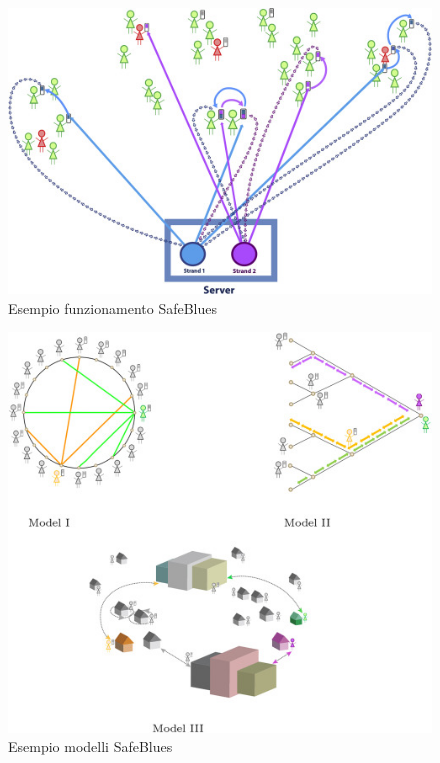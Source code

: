 \begin{figure}[h]
    \includegraphics[width=\linewidth]{img/gr2.jpg}
    \caption{Esempio funzionamento SafeBlues}
    \label{fig:SafeBlues_1}
\end{figure}

\begin{figure}[h]
    \includegraphics[width=\linewidth]{img/gr3.jpg}
    \caption{Esempio modelli SafeBlues}
    \label{fig:SafeBlues_models}
\end{figure}
